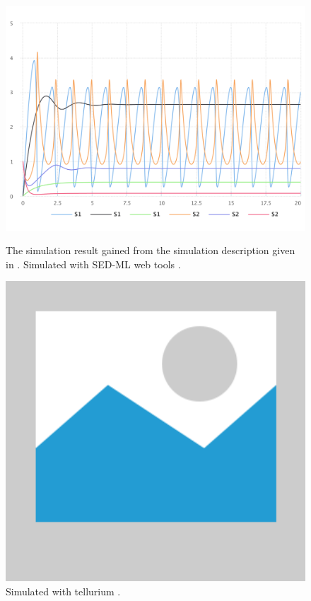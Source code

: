\begin{figure}[ht]
    \centering
    \begin{minipage}{0.47\textwidth}
        \centering
        \includegraphics[width=1.0\textwidth]{examples/repeated-scan-oscli/results/sedml_webtools/plot1}
        \caption{The simulation result gained from the simulation description given in . Simulated with SED-ML web tools \citep{bergmann2017sed}.}
    \end{minipage}\hfill
    \begin{minipage}{0.47\textwidth}
        \centering
        \includegraphics[width=1.0\textwidth]{examples/placeholder}
        \caption{Simulated with tellurium \citep{tellurium}.}
    \end{minipage}
    \label{fig:repeated-scan-oscli}
\end{figure}

